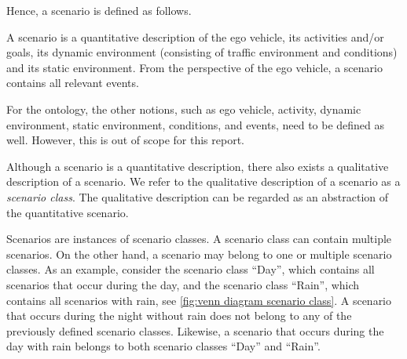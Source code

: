 Hence, a scenario is defined as follows.
\begin{definition}[Scenario]\label{def:scenario}
	A scenario is a quantitative description of the ego vehicle, its activities and/or goals, its dynamic environment (consisting of traffic environment and conditions) and its static environment. From the perspective of the ego vehicle, a scenario contains all relevant events.
\end{definition}

For the ontology, the other notions, such as ego vehicle, activity, dynamic environment, static environment, conditions, and events, need to be defined as well. However, this is out of scope for this report.

Although a scenario is a quantitative description, there also exists a qualitative description of a scenario. We refer to the qualitative description of a scenario as a \emph{scenario class}. The qualitative description can be regarded as an abstraction of the quantitative scenario.

Scenarios are instances of scenario classes. A scenario class can contain multiple scenarios. On the other hand, a scenario may belong to one or multiple scenario classes. As an example, consider the scenario class ``Day'', which contains all scenarios that occur during the day, and the scenario class ``Rain'', which contains all scenarios with rain, see \cref{fig:venn diagram scenario class}. A scenario that occurs during the night without rain does not belong to any of the previously defined scenario classes. Likewise, a scenario that occurs during the day with rain belongs to both scenario classes ``Day'' and ``Rain''. 

